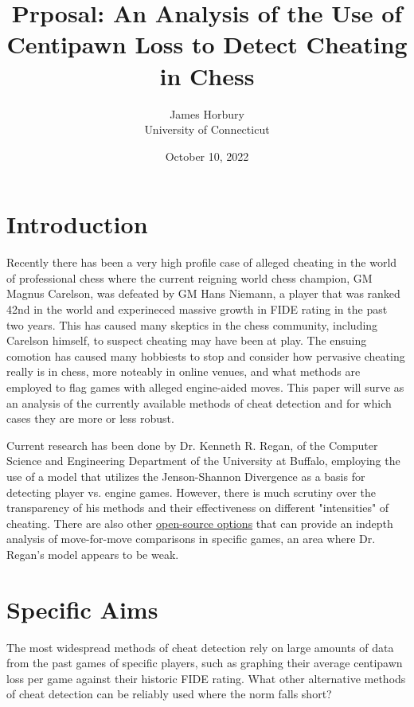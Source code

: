 \documentclass[12pt]{article}
\title{Prposal: An Analysis of the Use of Centipawn Loss to Detect Cheating in Chess}
\author{James Horbury\\
    University of Connecticut
}
\date{October 10, 2022}
\begin{document}
\maketitle

\section*{Introduction}
\label{sec:intro}

Recently there has been a very high profile case of alleged cheating in the world of professional chess 
where the current reigning world chess champion, GM Magnus Carelson, was defeated by GM Hans Niemann, a player 
that was ranked 42nd in the world and experineced massive growth in FIDE rating in the past two years. This 
has caused many skeptics in the chess community, including Carelson himself, to suspect cheating may have been 
at play. The ensuing comotion has caused many hobbiests to stop and consider how pervasive cheating
really is in chess, more noteably in online venues, and what methods are employed to flag games with alleged 
engine-aided moves. This paper will surve as an analysis of the currently available methods of cheat detection 
and for which cases they are more or less robust.

Current research \citep{regan2011understanding} has been done by Dr. Kenneth R. Regan, of the Computer Science and Engineering 
Department of the University at Buffalo, employing the use of a model that utilizes the Jenson-Shannon 
Divergence as a basis for detecting player vs. engine games. However, there is much scrutiny over the 
transparency of his methods and their effectiveness on different "intensities" of cheating. There are also 
other \href{https://github.com/MGleason1/PGN-Spy}{open-source options} that can provide an indepth analysis of move-for-move comparisons
in specific games, an area where Dr. Regan's model appears to be weak.

\section*{Specific Aims}
\label{sec:spec}

The most widespread methods of cheat detection rely on large amounts of data from the past games of specific 
players, such as graphing their average centipawn loss per game against their historic FIDE rating. What other 
alternative methods of cheat detection can be reliably used where the norm falls short?
\end{document}

